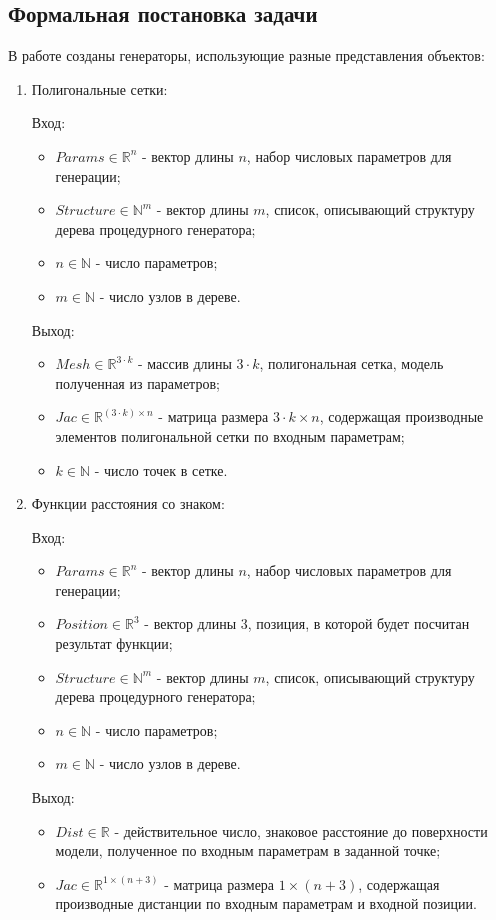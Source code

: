 \documentclass[a4paper,hidelinks,12pt]{article}
\begin{document}
\subsection{Формальная постановка задачи}
В работе созданы генераторы, использующие разные представления объектов:
\begin{enumerate}
\item Полигональные сетки:

Вход:
\begin{itemize}
    \item $Params \in \mathbb {R}^n$ - вектор длины $n$, набор числовых параметров для генерации;
    \item $Structure \in \mathbb {N}^m$ - вектор длины $m$, список, описывающий
структуру дерева процедурного генератора;
    \item $n \in \mathbb {N}$ - число параметров;
    \item $m \in \mathbb {N}$ - число узлов в дереве.
\end{itemize}
Выход:
\begin{itemize}
    \item $Mesh \in \mathbb {R}^{3 \cdot k}$ - массив длины $3 \cdot k$, полигональная сетка, модель полученная из параметров;
    \item $Jac \in \mathbb {R}^{(3 \cdot k) \times n}$ - матрица размера $3 
\cdot k \times n$, содержащая производные элементов полигональной сетки по входным параметрам;
    \item $k \in \mathbb {N}$ - число точек в сетке.
\end{itemize}
\item Функции расстояния со знаком:

Вход:
\begin{itemize}
    \item $Params \in \mathbb {R}^n$ - вектор длины $n$, набор числовых параметров для генерации;
    \item $Position \in \mathbb {R}^3$ - вектор длины $3$, позиция, в которой будет посчитан результат функции;
    \item $Structure \in \mathbb {N}^m$ - вектор длины $m$, список, описывающий
структуру дерева процедурного генератора;
    \item $n \in \mathbb {N}$ - число параметров;
    \item $m \in \mathbb {N}$ - число узлов в дереве.
\end{itemize}
Выход:
\begin{itemize}
    \item $Dist \in \mathbb {R}$ - действительное число, знаковое расстояние до поверхности модели, полученное по входным параметрам в заданной точке;
    \item $Jac \in \mathbb {R}^{1 \times (n+3)}$ - матрица размера $1 \times (n+3)$, содержащая производные дистанции по входным параметрам и входной позиции.
\end{itemize}
\end{enumerate}
\end{document}
